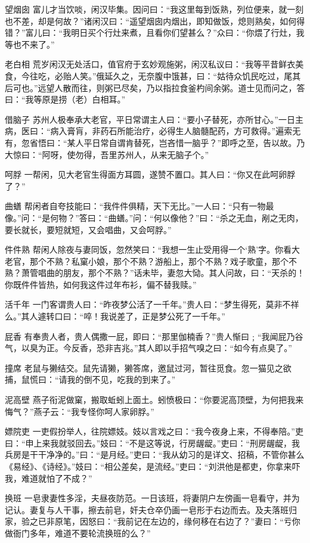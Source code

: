 \documentclass[12pt,UTF8]{ctexbook}
\begin{document}
望烟囱
富儿才当饮啖，闲汉毕集。因问曰：“我这里每到饭熟，列位便来，就一刻也不差，却是何故？”诸闲汉曰：“遥望烟囱内烟出，即知做饭，熄则熟矣，如何得错？”富儿曰：“我明日买个行灶来煮，且看你们望甚么？”众曰：“你煨了行灶，我等也不来了。”

老白相
荒岁闲汉无处活口，值官府于玄妙观施粥，闲汉私议曰：“我等平昔鲜衣美食，今往吃，必贻人笑。”俄延久之，无奈腹中饿甚，曰：“姑待众饥民吃过，尾其后可也。”远望人散而往，则粥已尽矣，乃以指拉食釜杓间余粥。道士见而问之，答曰：“我等原是捞（老）白相耳。”

借脑子
苏州人极奉承大老官，平日常谓主人曰：“要小子替死，亦所甘心。”一日主病，医曰：“病入膏肓，非药石所能治疗，必得生人脑髓配药，方可救得。”遍索无有，忽省悟曰：“某人平日常自谓肯替死，岂吝惜一脑乎？”即呼之至，告以故。乃大惊曰：“阿呀，使勿得，吾里苏州人，从来无脑子个。”

呵脬
一帮闲，见大老官生得面方耳圆，遂赞不置口。其人曰：“你又在此呵卵脬了？”

曲蟮
帮闲者自夸技能曰：“我件件俱精，天下无比。”一人曰：“只有一物最像。”问：“是何物？”答曰：“曲蟮。”问：“何以像他？”曰：“杀之无血，剐之无肉，要长就长，要短就短，又会唱曲，又会呵脬。”

件件熟
帮闲人除夜与妻同饭，忽然笑曰：“我想一生止受用得一个‘熟’字。你看大老官，那个不熟？私窠小娘，那个不熟？游船上，那个不熟？戏子歌童，那个不熟？萧管唱曲的朋友，那个不熟？”话未毕，妻忽大恸。其人问故，曰：“天杀的！你既件件皆热，如何我这件过年布衫，偏不替我赎。”

活千年
一门客谓贵人曰：“昨夜梦公活了一千年。”贵人曰：“梦生得死，莫非不祥么。”其人遽转口曰：“啐！我说差了，正是梦公死了一千年。”

屁香
有奉贵人者，贵人偶撒一屁，即曰：“那里伽楠香？”贵人惭曰﹔“我闻屁乃谷气，以臭为正。今反香，恐非吉兆。”其人即以手招气嗅之曰：“如今有点臭了。”

撞席
老鼠与獭结交。鼠先请獭，獭答席，邀鼠过河，暂往觅食。忽一猫见之欲捕，鼠慌曰：“请我的倒不见，吃我的到来了。”

泥高壁
燕子衔泥做窠，搬取蚯蚓上面土。蚓愤极曰：“你要泥高顶壁，为何把我来悔气？”燕子云：“我专怪你呵人家卵脬。”

嫖院吏
一吏假扮举人，往院嫖妓。妓以言戏之曰：“我今夜身上来，不得奉陪。”吏曰：“申上来我就驳回去。”妓曰：“不是这等说，行房龌龊。”吏曰：“刑房龌龊，我兵房是干干净净的。”曰：“是月经。”吏曰：“我从幼习的是详文、招稿，不管你甚么《易经》、《诗经》。”妓曰：“相公差矣，是流经。”吏曰：“刘洪他是都吏，你拿来吓我，难道就怕了不成？”

换班
一皂隶妻性多淫，夫昼夜防范。一日该班，将妻阴户左傍画一皂看守，并为记认。妻复与人干事，擦去前皂，奸夫仓卒仍画一皂形于右边而去。及夫落班归家，验之已非原笔，因怒曰：“我前记在左边的，缘何移在右边了？”妻曰：“亏你做衙门多年，难道不要轮流换班的么？”
\end{document}
